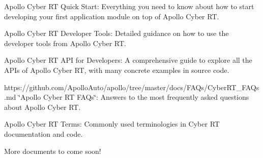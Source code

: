 
\begin{DoxyItemize}
\item Apollo Cyber R\-T Quick Start\-: Everything you need to know about how to start developing your first application module on top of Apollo Cyber R\-T.
\item Apollo Cyber R\-T Developer Tools\-: Detailed guidance on how to use the developer tools from Apollo Cyber R\-T.
\item Apollo Cyber R\-T A\-P\-I for Developers\-: A comprehensive guide to explore all the A\-P\-Is of Apollo Cyber R\-T, with many concrete examples in source code.
\item https\-://github.com/\-Apollo\-Auto/apollo/tree/master/docs/\-F\-A\-Qs/\-Cyber\-R\-T\-\_\-\-F\-A\-Qs.\-md \char`\"{}\-Apollo Cyber R\-T F\-A\-Qs\char`\"{}\-: Answers to the most frequently asked questions about Apollo Cyber R\-T.
\item Apollo Cyber R\-T Terms\-: Commonly used terminologies in Cyber R\-T documentation and code.
\end{DoxyItemize}

More documents to come soon! 